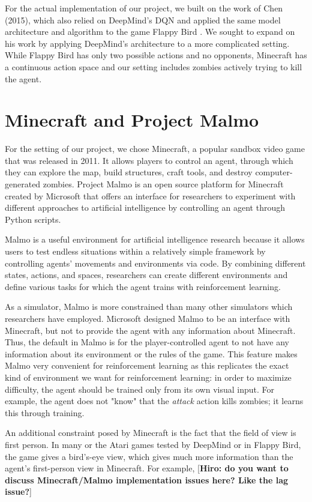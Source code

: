 \documentclass{article}
\begin{document}
\begin{multicols}{2}
For the actual implementation of our project, we built on the work of Chen (2015), which also relied on DeepMind's DQN and applied the same model architecture and algorithm to the game Flappy Bird \cite{flappyBird}.
We sought to expand on his work by applying DeepMind's architecture to a more complicated setting.
While Flappy Bird has only two possible actions and no opponents, Minecraft has a continuous action space and our setting includes zombies actively trying to kill the agent.




\section{Minecraft and Project Malmo}

For the setting of our project, we chose Minecraft, a popular sandbox video game that was released in 2011. It allows players to control an agent, through which they can explore the map, build structures, craft tools, and destroy computer-generated zombies.
Project Malmo is an open source platform for Minecraft created by Microsoft that offers an interface for researchers to experiment with different approaches to artificial intelligence by controlling an agent through Python scripts.

Malmo is a useful environment for artificial intelligence research because it allows users to test endless situations within a relatively simple framework by  controlling agents' movements and environments via code.
By combining different states, actions, and spaces, researchers can create different environments and define various tasks for which the agent trains with reinforcement learning.

As a simulator, Malmo is more constrained than many other simulators which researchers have employed. Microsoft designed Malmo to be an interface with Minecraft, but not to provide the agent with any information about Minecraft.
Thus, the default in Malmo is for the player-controlled agent to not have any information about its environment or the rules of the game.
This feature makes Malmo very convenient for reinforcement learning as this replicates the exact kind of environment we want for reinforcement learning: in order to maximize difficulty, the agent should be trained only from its own visual input.
For example, the agent does not "know" that the \emph{attack} action kills zombies; it learns this through training.

An additional constraint posed by Minecraft is the fact that the field of view is first person.
In many or the Atari games tested by DeepMind or in Flappy Bird, the game gives a bird's-eye view, which gives much more information than the agent's first-person view in Minecraft.
For example,
[{\bf Hiro: do you want to discuss Minecraft/Malmo implementation issues here? Like the lag issue?}]





\end{multicols}
\end{document}
